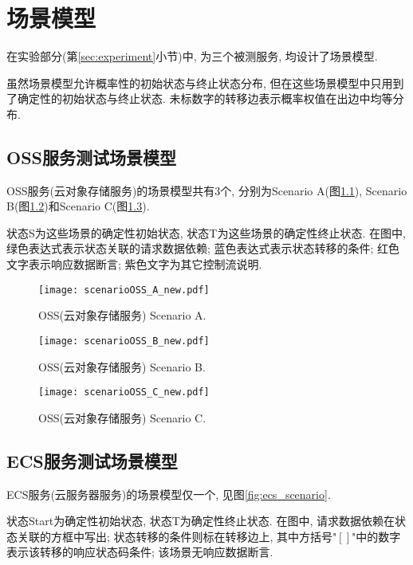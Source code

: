 \chapter{场景模型}

    在实验部分(第\ref{sec:experiment}小节)中, 为三个被测服务, 均设计了场景模型.
    
    虽然场景模型允许概率性的初始状态与终止状态分布, 但在这些场景模型中只用到了确定性的初始状态与终止状态. 未标数字的转移边表示概率权值在出边中均等分布.
    
    \section{OSS服务测试场景模型}
        OSS服务(云对象存储服务)的场景模型共有3个, 分别为Scenario A(图\ref{fig:oss_scenario_A}), Scenario B(图\ref{fig:oss_scenario_B})和Scenario C(图\ref{fig:oss_scenario_C}).

        状态S为这些场景的确定性初始状态, 状态T为这些场景的确定性终止状态. 在图中, 绿色表达式表示状态关联的请求数据依赖; 蓝色表达式表示状态转移的条件; 红色文字表示响应数据断言; 紫色文字为其它控制流说明.
        
        \begin{figure}[!htb]
            \centering
            \texttt{[image: scenarioOSS\_A\_new.pdf]}
            \caption[]{OSS(云对象存储服务) Scenario A.}
            \label{fig:oss_scenario_A}
        \end{figure}
        
         \begin{figure}[!htb]
            \centering
            \texttt{[image: scenarioOSS\_B\_new.pdf]}
            \caption[]{OSS(云对象存储服务) Scenario B.}
            \label{fig:oss_scenario_B}
        \end{figure}
        
         \begin{figure}[!htb]
            \centering
            \texttt{[image: scenarioOSS\_C\_new.pdf]}
            \caption[]{OSS(云对象存储服务) Scenario C.}
            \label{fig:oss_scenario_C}
        \end{figure}
    
    \section{ECS服务测试场景模型}
        ECS服务(云服务器服务)的场景模型仅一个, 见图\ref{fig:ecs_scenario}. 

        状态Start为确定性初始状态, 状态T为确定性终止状态. 在图中, 请求数据依赖在状态关联的方框中写出; 状态转移的条件则标在转移边上, 其中方括号"$\left[\right]$"中的数字表示该转移的响应状态码条件; 该场景无响应数据断言.
        
